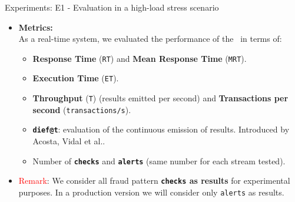 \begin{frame}{Experiments: E1 - Evaluation in a high-load stress scenario}
\begin{itemize}
\item \textbf{Metrics:\\}
    \vspace{0.5em}
    As a real-time system, we evaluated the performance of the \DPATM\ in terms of:
    \vspace{0.5em}
    \begin{itemize}
        \item \textbf{Response Time} (\texttt{RT}) and \textbf{Mean Response Time} (\texttt{MRT}).
        \vspace{0.5em}
        \item \textbf{Execution Time} (\texttt{ET}).
        \vspace{0.5em}
        \item \textbf{Throughput} (\texttt{T}) (results emitted per second) and \textbf{Transactions per second} (\texttt{transactions/s}).
        \vspace{0.5em}
        \item \textbf{\texttt{dief@t}}: evaluation of the continuous emission of results. Introduced by Acosta, Vidal et al.\cite{AcostaVidal2017}.
        \vspace{0.5em}
        \item Number of \textbf{\texttt{checks}} and \textbf{\texttt{alerts}} (same number for each stream tested).
    \end{itemize}
\vspace{0.5em}
\item \textcolor{red}{Remark}: We consider all fraud pattern \textbf{\texttt{checks} as results} for experimental purposes. In a production version we will consider only \texttt{alerts} as results.

\end{itemize}

\end{frame}



